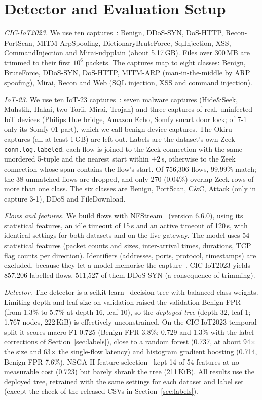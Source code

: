 \section{Detector and Evaluation Setup}\label{sec:setup}

\emph{CIC-IoT2023.} We use ten captures~\cite{neto2023ciciot2023}: Benign, DDoS-SYN, DoS-HTTP, Recon-PortScan, MITM-ArpSpoofing, DictionaryBruteForce, SqlInjection, XSS, CommandInjection and Mirai-udpplain (about 5.17\,GB). Files over 300\,MB are trimmed to their first $10^6$ packets. The captures map to eight classes: Benign, BruteForce, DDoS-SYN, DoS-HTTP, MITM-ARP (man-in-the-middle by ARP spoofing), Mirai, Recon and Web (SQL injection, XSS and command injection).

\emph{IoT-23.} We use ten IoT-23 captures~\cite{garcia2020iot23}: seven malware captures (Hide\&Seek, Muhstik, Hakai, two Torii, Mirai, Trojan) and three captures of real, uninfected IoT devices (Philips Hue bridge, Amazon Echo, Somfy smart door lock; of 7-1 only its Somfy-01 part), which we call benign-device captures. The Okiru captures (all at least 1\,GB) are left out. Labels are the dataset's own Zeek \texttt{conn.log.labeled}: each flow is joined to the Zeek connection with the same unordered 5-tuple and the nearest start within $\pm2$\,s, otherwise to the Zeek connection whose span contains the flow's start. Of 756,306 flows, 99.99\% match; the 38 unmatched flows are dropped, and only 270 (0.04\%) overlap Zeek rows of more than one class. The six classes are Benign, PortScan, C\&C, Attack (only in capture 3-1), DDoS and FileDownload.

\emph{Flows and features.} We build flows with NFStream~\cite{aouini2022nfstream} (version 6.6.0), using its statistical features, an idle timeout of 15\,s and an active timeout of 120\,s, with identical settings for both datasets and on the live gateway. The model uses 54 statistical features (packet counts and sizes, inter-arrival times, durations, TCP flag counts per direction). Identifiers (addresses, ports, protocol, timestamps) are excluded, because they let a model memorise the capture~\cite{arp2022dos}. CIC-IoT2023 yields 857,206 labelled flows, 511,527 of them DDoS-SYN (a consequence of trimming).

\emph{Detector.} The detector is a scikit-learn~\cite{pedregosa2011sklearn} decision tree with balanced class weights. Limiting depth and leaf size on validation raised the validation Benign FPR (from 1.3\% to 5.7\% at depth 16, leaf 10), so the \emph{deployed tree} (depth 32, leaf 1; 1,767 nodes, 222\,KiB) is effectively unconstrained. On the CIC-IoT2023 temporal split it scores macro-F1 0.725 (Benign FPR 3.8\%; 0.729 and 1.3\% with the label corrections of Section~\ref{sec:labels}), close to a random forest (0.737, at about 94$\times$ the size and 63$\times$ the single-flow latency) and histogram gradient boosting (0.714, Benign FPR 7.6\%). NSGA-II feature selection~\cite{deb2002nsga2,blank2020pymoo} kept 14 of 54 features at no measurable cost (0.723) but barely shrank the tree (211\,KiB). All results use the deployed tree, retrained with the same settings for each dataset and label set (except the check of the released CSVs in Section~\ref{sec:labels}).

